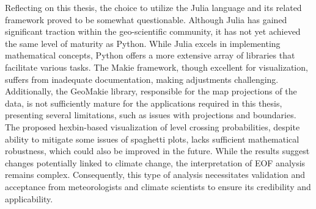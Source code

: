 %
%

Reflecting on this thesis, the choice to utilize the Julia language and its related framework proved to be somewhat questionable. Although Julia has gained significant traction within the geo-scientific community, it has not yet achieved the same level of maturity as Python. While Julia excels in implementing mathematical concepts, Python offers a more extensive array of libraries that facilitate various tasks.
The Makie framework, though excellent for visualization, suffers from inadequate documentation, making adjustments challenging. 
Additionally, the GeoMakie library, responsible for the map projections of the data, is not sufficiently mature for the applications required in this thesis, presenting several limitations, such as issues with projections and boundaries.
The proposed hexbin-based visualization of level crossing probabilities, despite ability to mitigate some issues of spaghetti plots, lacks sufficient mathematical robustness, which could also be improved in the future.
While the results suggest changes potentially linked to climate change, the interpretation of EOF analysis remains complex. 
Consequently, this type of analysis necessitates validation and acceptance from meteorologists and climate scientists to ensure its credibility and applicability.


